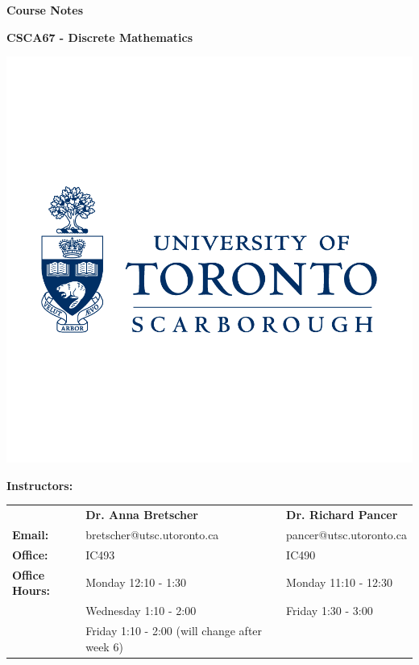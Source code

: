 \documentclass{article}
\begin{document}
\begin{titlepage}
\begin{center}
  \vspace{5cm}

  \Large {\textbf{Course Notes}}\\
  \hrulefill
  \vspace{0.3cm}

  \textbf{\huge CSCA67 - Discrete Mathematics}

  \hrulefill

  \vspace{0.5cm}

  \includegraphics[scale = 0.25]{UTSC}

  \vspace{9cm}

  \end{center}

  \textbf{Instructors:}

  \begin{center}

  \begin{tabular}{lll}
   &\textbf{Dr. Anna Bretscher}&\textbf{Dr. Richard Pancer}\\
  \textbf{Email:} & bretscher@utsc.utoronto.ca & pancer@utsc.utoronto.ca\\
  \textbf{Office:} & IC493 & IC490\\
  \textbf{Office Hours:}& Monday 12:10 - 1:30 & Monday 11:10 - 12:30\\
   & Wednesday 1:10 - 2:00 & Friday 1:30 - 3:00\\
   & Friday 1:10 - 2:00 (will change after week 6)&
  \end{tabular}

  \end{center}

\end{titlepage}
\pagestyle{fancy}
\end{document}
